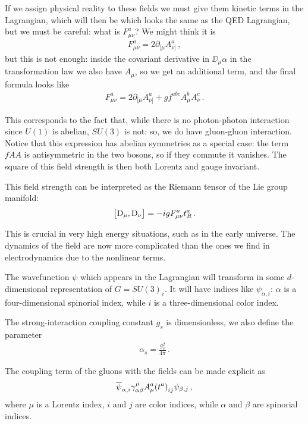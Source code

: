 \documentclass[main.tex]{subfiles}
\begin{document}
If we assign physical reality to these fields we must give them kinetic terms in the Lagrangian, which will then be 
%
%
which looks the same as the QED Lagrangian, but we must be careful: what is \(F_{\mu \nu }^{a}\)?
We might think it is 
%
\begin{align}
F^{a}_{\mu \nu } = 2 \partial_{[\mu } A^{a}_{\nu ]}
\,,
\end{align}
%
but this is not enough: inside the covariant derivative in \(\DD_{\mu } \alpha \) in the transformation law we also have \(A_{\mu }\), so we get an additional term, and the final formula looks like 
%
\begin{align}
F^{a}_{\mu \nu } = 2 \partial_{[\mu } A^{a}_{\nu ]} + g f^{abc} A^{b}_{\mu } A^{c}_{\nu }
\,.
\end{align}

This corresponds to the fact that, while there is no photon-photon interaction since \(U(1)\) is abelian,  \(SU(3)\) is not: so, we do have gluon-gluon interaction. 
Notice that this expression has abelian symmetries as a special case: the term \(fAA\) is antisymmetric in the two bosons, so if they commute it vanishes. 
The square of this field strength is then both Lorentz and gauge invariant.

This field strength can be interpreted as the Riemann tensor of the Lie group manifold: 
%
\begin{align}
\qty[\mathrm{D}_\mu , \mathrm{D}_\nu] = -ig F^{a}_{\mu \nu } t^{a}_{R}
\,.
\end{align}

This is crucial in very high energy situations, such as in the early universe. The dynamics of the field are now more complicated than the ones we find in electrodynamics due to the nonlinear terms.

The wavefunction \(\psi\) which appears in the Lagrangian will transform in some \(d\)-di\-men\-sio\-nal representation of \(G = SU(3)_c\). 
It will have indices like \(\psi_{\alpha , i}\): \(\alpha \) is a four-dimensional spinorial index, while \(i\) is a three-dimensional color index. 

The strong-interaction coupling constant \(g_s \) is dimensionless, we also define the parameter
%
\begin{align}
\alpha_{s} = \frac{g_s^2}{4 \pi }
\,.
\end{align}

The coupling term of the gluons with the fields can be made explicit as 
%
\begin{align}
\overline{\psi}_{\alpha, i} \gamma^{\mu }_{\alpha \beta } A^{a}_{\mu } \qty(t^{a})_{ij} \psi_{\beta, j}
\,,
\end{align}
%
where \(\mu \) is a Lorentz index, \(i\) and \(j\) are color indices, while \(\alpha \) and \(\beta \) are spinorial indices.
\end{document}
